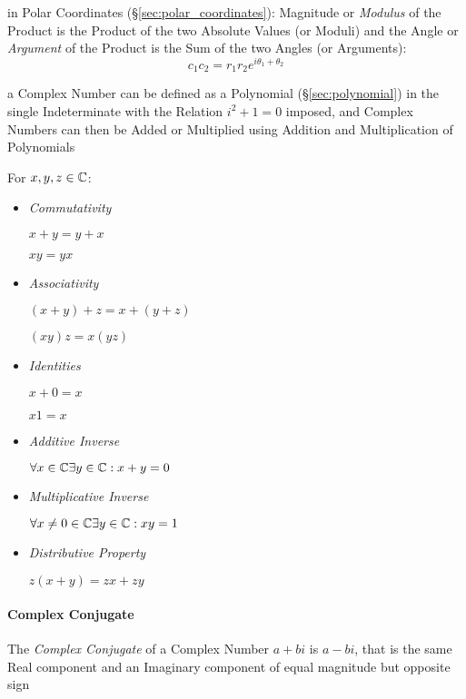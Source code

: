 in Polar Coordinates (\S\ref{sec:polar_coordinates}): Magnitude or
\emph{Modulus} of the Product is the Product of the two Absolute
Values (or Moduli) and the Angle or \emph{Argument} of the Product is
the Sum of the two Angles (or Arguments):
\[
  c_1 c_2 = r_1 r_2 e^{i\theta_1 + \theta_2}
\]

a Complex Number can be defined as a Polynomial (\S\ref{sec:polynomial}) in the
single Indeterminate with the Relation $i^2 + 1 = 0$ imposed, and Complex
Numbers can then be Added or Multiplied using Addition and Multiplication of
Polynomials



For $x,y,z \in \mathbb{C}$:
\begin{itemize}
\item \emph{Commutativity}

$x + y = y + x$

$xy = yx$


\item \emph{Associativity}

$(x + y) + z = x + (y + z)$

$(xy)z = x(yz)$


\item \emph{Identities}

$x + 0 = x$

$x1 = x$


\item \emph{Additive Inverse}

$\forall x \in \mathbb{C} \exists y \in \mathbb{C} : x + y = 0$


\item \emph{Multiplicative Inverse}

$\forall x \neq 0 \in \mathbb{C} \exists y \in \mathbb{C} : xy = 1$


\item \emph{Distributive Property}

$z (x + y) = zx + zy$

\end{itemize}



\paragraph{Complex Conjugate}\label{sec:complex_conjugate}\hfill

The \emph{Complex Conjugate} of a Complex Number $a + bi$ is $a - bi$, that is
the same Real component and an Imaginary component of equal magnitude but
opposite sign

